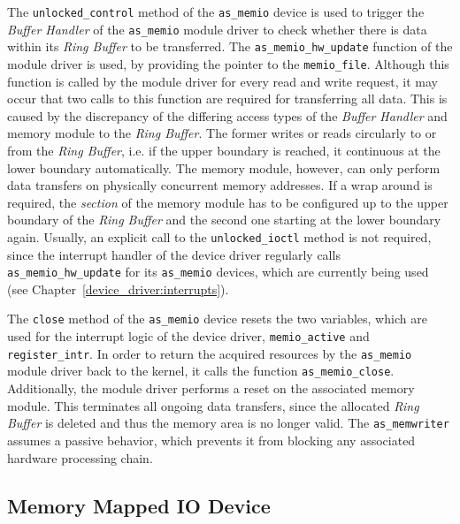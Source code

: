 The \texttt{unlocked\_control} method of the \texttt{as\_memio} device is used to trigger the \textit{Buffer Handler} of the \texttt{as\_memio} module driver to check whether there is data within its \textit{Ring Buffer} to be transferred.
The \texttt{as\_memio\_hw\_update} function of the module driver is used, by providing the pointer to the \texttt{memio\_file}.
Although this function is called by the module driver for every read and write request, it may occur that two calls to this function are required for transferring all data.
This is caused by the discrepancy of the differing access types of the \textit{Buffer Handler} and memory module to the \textit{Ring Buffer}.
The former writes or reads circularly to or from the \textit{Ring Buffer}, i.e. if the upper boundary is reached, it continuous at the lower boundary automatically.
The memory module, however, can only perform data transfers on physically concurrent memory addresses.
If a wrap around is required, the \textit{section} of the memory module has to be configured up to the upper boundary of the \textit{Ring Buffer} and the second one starting at the lower boundary again.
Usually, an explicit call to the \texttt{unlocked\_ioctl} method is not required, since the interrupt handler of the \asterics device driver regularly calls \texttt{as\_memio\_hw\_update} for its \texttt{as\_memio} devices, which are currently being used (see Chapter~\ref{device_driver:interrupts}).\newline

The \texttt{close} method of the \texttt{as\_memio} device resets the two variables, which are used for the interrupt logic of the device driver, \texttt{memio\_active} and \texttt{register\_intr}. 
In order to return the acquired resources by the \texttt{as\_memio} module driver back to the kernel, it calls the function \texttt{as\_memio\_close}.
Additionally, the module driver performs a reset on the associated memory module.
This terminates all ongoing data transfers, since the allocated \textit{Ring Buffer} is deleted and thus the memory area is no longer valid.
The \texttt{as\_memwriter} assumes a passive behavior, which prevents it from blocking any associated hardware processing chain.


\subsection{Memory Mapped IO Device}


